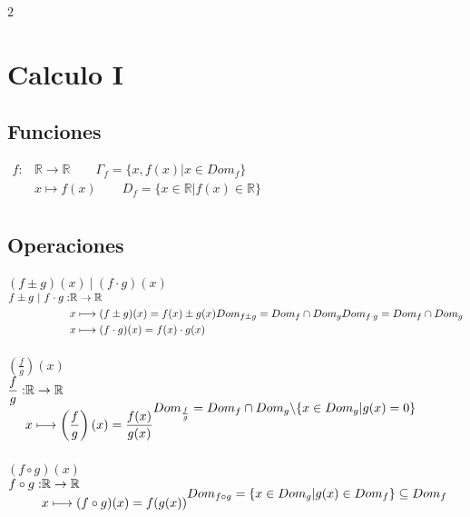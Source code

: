 \documentclass{article}
\begin{document}
\thispagestyle{empty}

\begin{multicols}{2}
\section{Calculo I}
\subsection{Funciones}

$
\begin{aligned}
    f : &\mathbb{R} \rightarrow \mathbb{R} \quad \quad \Gamma_f=\{x,f(x) | x \in Dom_f\}\\
        &x \longmapsto f(x)    \quad \quad  D_f = \{ x \in \mathbb{R} | f(x) \in \mathbb{R} \}\\
\end{aligned}
$
\subsection{Operaciones}
$(f \pm g) (x) \ | \ (f \cdot g) (x)$
\\
$
\begin{aligned}
    f \pm g \ | \ f \cdot g: &\mathbb{R} \rightarrow \mathbb{R}\\
            &x \longmapsto (f\pm g)(x) = f(x) \pm g(x) \\
            &x \longmapsto (f\cdot g)(x) = f(x) \cdot g(x)
\end{aligned}
\\
Dom_{f \pm g}= Dom_f \cap Dom_g \\  Dom_{f \cdot g}= Dom_f \cap Dom_g
$
\\\\
$\left(\frac{f}{g}\right) (x)$
\\
$
\begin{aligned}
    \frac{f}{g} : &\mathbb{R} \rightarrow \mathbb{R}\\
            &x \longmapsto \left(\frac{f}{g}\right)(x) = \frac{f(x)}{g(x)}
\end{aligned}
\\
Dom_{\frac{f}{g}}= Dom_f \cap Dom_g \backslash \{ x \in Dom_g | g(x) = 0\}
$
\\\\
$(f \circ g) (x)$
\\
$
\begin{aligned}
    f \circ g : &\mathbb{R} \rightarrow \mathbb{R}\\
            &x \longmapsto (f\circ g)(x) = f(g(x))
\end{aligned}
\\
Dom_{f \circ g}= \{ x \in Dom_g | g(x) \in Dom_f\} \subseteq Dom_f\
$


\end{multicols}
\end{document}
